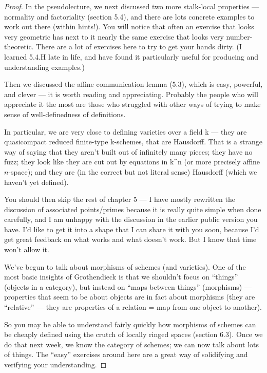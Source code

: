\documentclass{book}
\theoremstyle{definition}
\begin{document}
\begin{proof}
In the pseudolecture, we next discussed two more stalk-local properties — normality and factoriality (section 5.4), and there are lots concrete examples to work out there (within hints!). You will notice that often an exercise that looks very geometric has next to it nearly the same exercise that looks very number-theoretic. There are a lot of exercises here to try to get your hands dirty. (I learned 5.4.H late in life, and have found it particularly useful for producing and understanding examples.)

Then we discussed the affine communication lemma (5.3), which is easy, powerful, and clever — it is worth reading and appreciating. Probably the people who will appreciate it the most are those who struggled with other ways of trying to make sense of well-definedness of definitions.

In particular, we are very close to defining varieties over a field k — they are quasicompact reduced finite-type k-schemes, that are Hausdorff. That is a strange way of saying that they aren’t built out of infinitely many pieces; they have no fuzz; they look like they are cut out by equations in k^n (or more precisely affine $n$-space); and they are (in the correct but not literal sense) Hausdorff (which we haven’t yet defined).

You should then skip the rest of chapter 5 — I have mostly rewritten the discussion of associated points/primes because it is really quite simple when done carefully, and I am unhappy with the discussion in the earlier public version you have. I’d like to get it into a shape that I can share it with you soon, because I’d get great feedback on what works and what doesn’t work. But I know that time won’t allow it.

We’ve begun to talk about morphisms of schemes (and varieties). One of the most basic insights of Grothendieck is that we shouldn’t focus on “things” (objects in a category), but instead on “maps between things” (morphisms) — properties that seem to be about objects are in fact about morphisms (they are “relative” — they are properties of a relation = map from one object to another).

So you may be able to understand fairly quickly how morphisms of schemes can be cheaply defined using the crutch of locally ringed spaces (section 6.3). Once we do that next week, we know the category of schemes; we can now talk about lots of things. The “easy” exercises around here are a great way of solidifying and verifying your understanding.


\end{proof}
\end{document}
